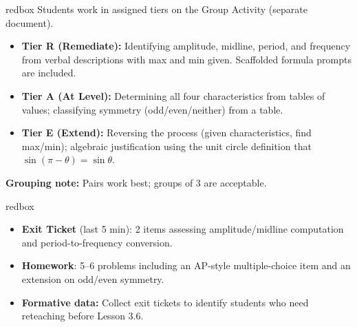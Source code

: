 \documentclass[10pt]{article}
\begin{document}
\begin{skillbox}{redbox}
  Students work in assigned tiers on the Group Activity (separate document).
  \begin{itemize}
    \item \textbf{Tier R (Remediate):} Identifying amplitude, midline, period, and
          frequency from verbal descriptions with max and min given.
          Scaffolded formula prompts are included.
    \item \textbf{Tier A (At Level):} Determining all four characteristics from
          tables of values; classifying symmetry (odd/even/neither) from a table.
    \item \textbf{Tier E (Extend):} Reversing the process (given characteristics,
          find max/min); algebraic justification using the unit circle definition
          that $\sin(\pi-\theta)=\sin\theta$.
  \end{itemize}
  \textbf{Grouping note:} Pairs work best; groups of 3 are acceptable.
\end{skillbox}

\begin{skillbox}{redbox}
  \begin{itemize}
    \item \textbf{Exit Ticket} (last 5 min): 2 items assessing amplitude/midline
          computation and period-to-frequency conversion.
    \item \textbf{Homework}: 5--6 problems including an AP-style multiple-choice
          item and an extension on odd/even symmetry.
    \item \textbf{Formative data:} Collect exit tickets to identify students who
          need reteaching before Lesson 3.6.
  \end{itemize}
\end{skillbox}
\end{document}
